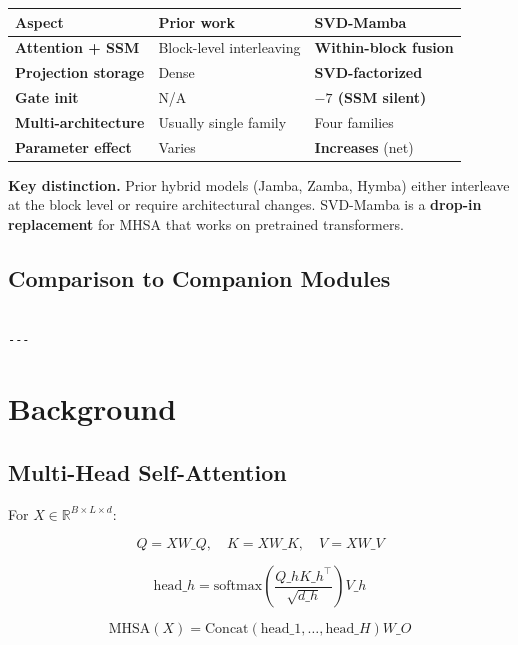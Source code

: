 \begin{table}[H]
\centering
\small
\begin{tabular}{lll}
\toprule
\textbf{Aspect} & \textbf{Prior work} & \textbf{SVD-Mamba} \\
\midrule
\textbf{Attention + SSM} & Block-level interleaving & \textbf{Within-block fusion} \\
\textbf{Projection storage} & Dense & \textbf{SVD-factorized} \\
\textbf{Gate init} & N/A & \textbf{$-7$ (SSM silent)} \\
\textbf{Multi-architecture} & Usually single family & Four families \\
\textbf{Parameter effect} & Varies & \textbf{Increases} (net) \\
\bottomrule
\end{tabular}
\end{table}

\textbf{Key distinction.} Prior hybrid models (Jamba, Zamba, Hymba) either 
interleave at the block level or require architectural changes. SVD-Mamba 
is a \textbf{drop-in replacement} for MHSA that works on pretrained transformers.

\subsection{Comparison to Companion Modules}

\begin{lstlisting}

---
\end{lstlisting}


\section{Background}

\subsection{Multi-Head Self-Attention}

For $X \in \mathbb{R}^{B \times L \times d}$:

\[
Q = X W\_Q, \quad K = X W\_K, \quad V = X W\_V
\tag{3.1}
\]

\[
\text{head}\_h = \text{softmax}\!\left(\frac{Q\_h K\_h^\top}{\sqrt{d\_h}}\right) V\_h
\tag{3.2}
\]

\[
\text{MHSA}(X) = \text{Concat}(\text{head}\_1, \dots, \text{head}\_H) W\_O
\tag{3.3}
\]

